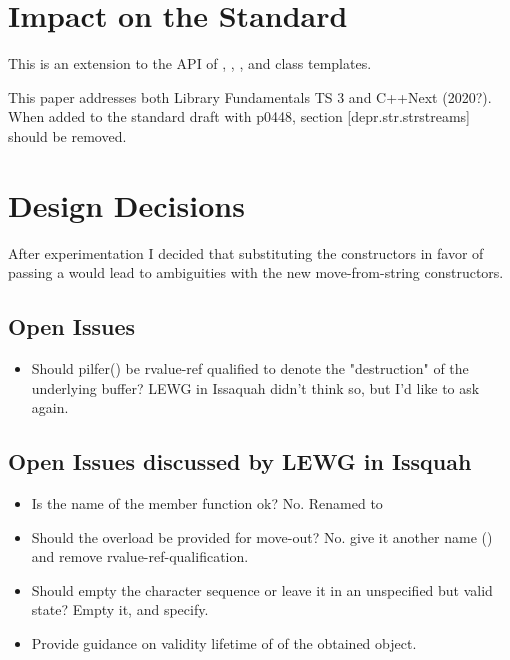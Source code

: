 \documentclass[ebook,11pt,article]{memoir}
\begin{document}


\chapter{Impact on the Standard}
This is an extension to the API of , , , and  class templates.

This paper addresses both Library Fundamentals TS 3 and C++Next (2020?). 
When added to the standard draft with p0448, section [depr.str.strstreams] should be removed.
\chapter{Design Decisions}
After experimentation I decided that substituting the  constructors in favor of passing a  would lead to ambiguities with the new move-from-string constructors.
\section{Open Issues}
\begin{itemize}
\item Should pilfer() be rvalue-ref qualified to denote the "destruction" of the underlying buffer? LEWG in Issaquah didn't think so, but I'd like to ask again.
\end{itemize}

\section{Open Issues discussed by LEWG in Issquah}
\begin{itemize}
\item Is the name of the  member function ok? No. Renamed to 
\item Should the  overload be provided for move-out? No. give it another name () and remove rvalue-ref-qualification.
\item Should  empty the character sequence or leave it in an unspecified but valid state? Empty it, and specify.
\item Provide guidance on validity lifetime of of the obtained  object.
\end{itemize}
\end{document}

